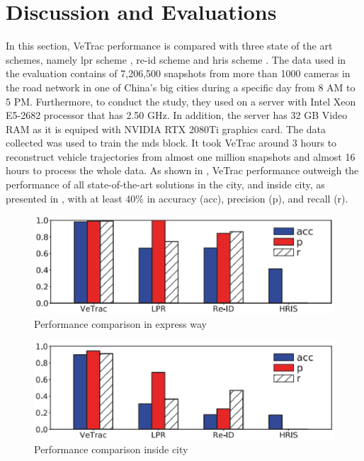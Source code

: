 \section{Discussion and Evaluations}  \label{sec:discussion_evaluations}

In this section, VeTrac performance is compared with three state of the art schemes, namely \ac{lpr} scheme \cite{simonyan2014very}, \ac{re-id} scheme \cite{liu2017provid} and \ac{hris} scheme \cite{zheng2012reducing}.
The data used in the evaluation contains of 7,206,500 snapshots from more than 1000 cameras in the road network in one of China's big cities during a specific day from 8 AM to 5 PM.
Furthermore, to conduct the study, they used on a server with Intel Xeon E5-2682 processor that has 2.50 GHz.
In addition, the server has 32 GB Video RAM as it is equiped with NVIDIA RTX 2080Ti graphics card.
The data collected was used to train the \ac{mds} block.
It took VeTrac around 3 hours to reconstruct vehicle trajectories from almost one million snapshots and almost 16 hours to process the whole data.
As shown in , VeTrac performance outweigh the performance of all state-of-the-art solutions in the city, and inside city, as presented in , with at least 40\% in accuracy (acc), precision (p), and recall (r).

\begin{figure}
\centering
  \includegraphics[width=0.9\linewidth]{figures/performance-comparison.eps}
  \caption{Performance comparison in express way \cite{tong2021large}}
  \label{fig:performance-comparison}
\end{figure}

\begin{figure}
\centering
  \includegraphics[width=0.9\linewidth]{figures/performance-comparison-urban.eps}
  \caption{Performance comparison inside city \cite{tong2021large}}
  \label{fig:performance-comparison-city}
\end{figure}

